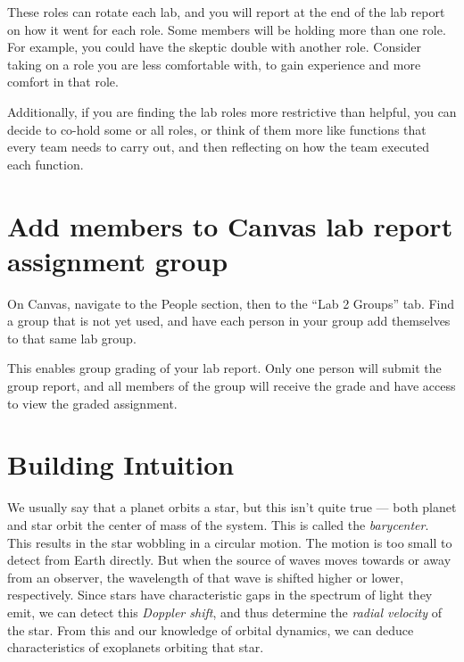 These roles can rotate each lab, and you will report at the end of the lab report on how it went for each role. Some members will be holding more than one role. For example, you could have the skeptic double with another role. Consider taking on a role you are less comfortable with, to gain experience and more comfort in that role.

Additionally, if you are finding the lab roles more restrictive than helpful, you can decide to co-hold some or all roles, or think of them more like functions that every team needs to carry out, and then reflecting on how the team executed each function.

\section{Add members to Canvas lab report assignment group}

\begin{steps}
	\item On Canvas, navigate to the People section, then to the ``Lab 2 Groups'' tab. Find a group that is not yet used, and have each person in your group add themselves to that same lab group.
\end{steps}

This enables group grading of your lab report. Only one person will submit the group report, and all members of the group will receive the grade and have access to view the graded assignment.

\section{Building Intuition}

We usually say that a planet orbits a star, but this isn't quite true --- both planet and star orbit the center of mass of the system. This is called the \textit{barycenter}. This results in the star wobbling in a circular motion. The motion is too small to detect from Earth directly. But when the source of waves moves towards or away from an observer, the wavelength of that wave is shifted higher or lower, respectively. Since stars have characteristic gaps in the spectrum of light they emit, we can detect this \textit{Doppler shift}, and thus determine the \textit{radial velocity} of the star. From this and our knowledge of orbital dynamics, we can deduce characteristics of exoplanets orbiting that star.

